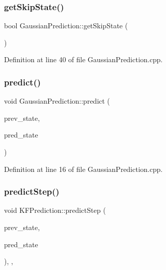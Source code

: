 \subsubsection{\texorpdfstring{get\+Skip\+State()}{getSkipState()}}
{\footnotesize\ttfamily bool Gaussian\+Prediction\+::get\+Skip\+State (\begin{DoxyParamCaption}{ }\end{DoxyParamCaption})\hspace{0.3cm}{\ttfamily [inherited]}}



Definition at line 40 of file Gaussian\+Prediction.\+cpp.

\mbox{\label{classbfl_1_1GaussianPrediction_a37195b6f9a8799ac3d357500b8142676}} 
\subsubsection{\texorpdfstring{predict()}{predict()}}
{\footnotesize\ttfamily void Gaussian\+Prediction\+::predict (\begin{DoxyParamCaption}\item[{const \mbox{\hyperlink{classbfl_1_1GaussianMixture}{Gaussian\+Mixture}} \&}]{prev\+\_\+state,  }\item[{\mbox{\hyperlink{classbfl_1_1GaussianMixture}{Gaussian\+Mixture}} \&}]{pred\+\_\+state }\end{DoxyParamCaption})\hspace{0.3cm}{\ttfamily [inherited]}}



Definition at line 16 of file Gaussian\+Prediction.\+cpp.

\mbox{\label{classbfl_1_1KFPrediction_aa71d6b8ac030c54e86d3e91a94bb2db9}} 
\subsubsection{\texorpdfstring{predict\+Step()}{predictStep()}}
{\footnotesize\ttfamily void K\+F\+Prediction\+::predict\+Step (\begin{DoxyParamCaption}\item[{const \mbox{\hyperlink{classbfl_1_1GaussianMixture}{Gaussian\+Mixture}} \&}]{prev\+\_\+state,  }\item[{\mbox{\hyperlink{classbfl_1_1GaussianMixture}{Gaussian\+Mixture}} \&}]{pred\+\_\+state }\end{DoxyParamCaption})\hspace{0.3cm}{\ttfamily [override]}, {\ttfamily [protected]}, {\ttfamily [virtual]}}



